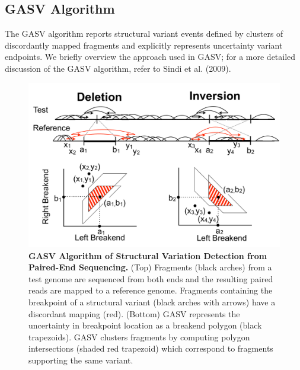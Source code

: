 \documentclass[11pt]{article}
\begin{document}
\subsection{GASV Algorithm}
The GASV algorithm reports structural variant events defined by clusters of discordantly mapped fragments and explicitly represents uncertainty variant endpoints. We briefly overview the approach used in GASV; for a more detailed discussion of the GASV algorithm, refer to Sindi et al. (2009).

\begin{figure}
\includegraphics[width = 0.5 \textwidth] {Figures/GASV_Illustration.pdf} %
\caption{\textbf{GASV Algorithm of Structural Variation Detection from Paired-End Sequencing.}  (Top) Fragments (black arches) from a test genome are sequenced from both ends and the resulting paired reads are mapped to a reference genome. Fragments containing the breakpoint of a structural variant (black arches with arrows) have a discordant mapping (red).  (Bottom) GASV represents the uncertainty in breakpoint location as a breakend polygon (black trapezoids). GASV clusters fragments by computing polygon intersections (shaded red trapezoid) which correspond to fragments supporting the same variant.}
   \label{fig:illustration}
\end{figure}
\end{document}
